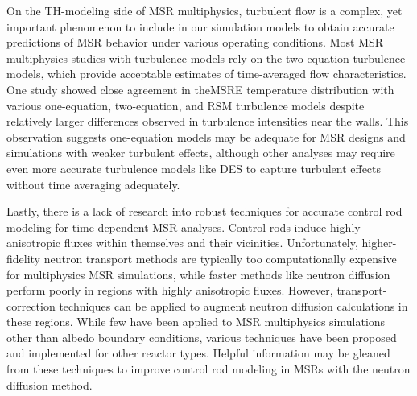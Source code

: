 On the \gls{TH}-modeling side of \gls{MSR} multiphysics, turbulent flow is a complex, yet important
phenomenon to include in our simulation models to obtain accurate predictions of \gls{MSR} behavior
under various operating conditions. Most \gls{MSR} multiphysics studies with turbulence models rely
on the two-equation turbulence models, which provide acceptable estimates of time-averaged flow
characteristics. One study \cite{podila_cfd_2019} showed close agreement in the\gls{MSRE}
temperature distribution with various one-equation, two-equation, and \gls{RSM} turbulence
models despite relatively larger differences observed in turbulence intensities near the walls.
This observation suggests one-equation models may be adequate for \gls{MSR} designs and simulations
with weaker turbulent effects, although other analyses may require even more accurate turbulence
models like \gls{DES} to capture turbulent effects without time averaging adequately.

Lastly, there is a lack of research into robust techniques for accurate control rod modeling for
time-dependent \gls{MSR} analyses. Control rods induce highly anisotropic fluxes within themselves
and their vicinities.
Unfortunately, higher-fidelity neutron transport methods are typically too computationally
expensive for multiphysics \gls{MSR} simulations, while faster methods like neutron
diffusion perform poorly in regions with highly anisotropic fluxes. However, transport-correction
techniques can be applied to augment neutron diffusion calculations in these regions. While few
have been applied to \gls{MSR} multiphysics simulations other than albedo boundary conditions,
various techniques have been proposed and implemented for other reactor types. Helpful information
may be gleaned from these techniques to improve control rod modeling in \glspl{MSR} with the
neutron diffusion method.
